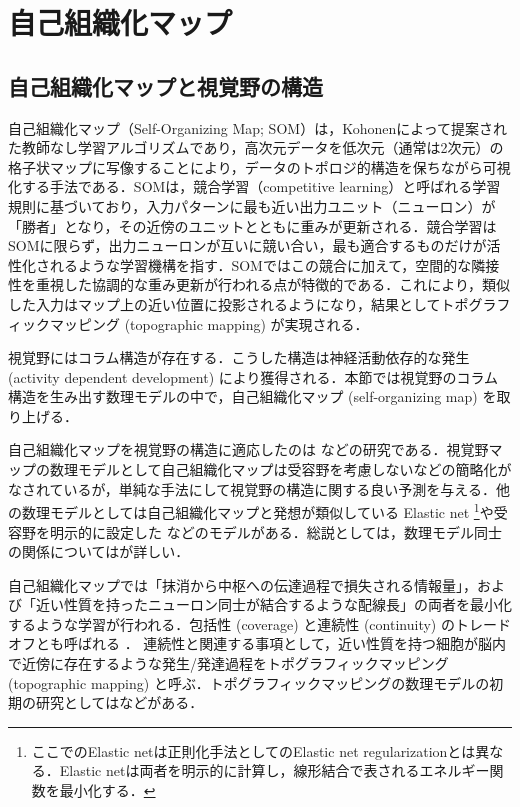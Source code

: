 \documentclass[titlepage]{ltjsbook}
\begin{document}
\section{自己組織化マップ}
\subsection{自己組織化マップと視覚野の構造}
自己組織化マップ（Self-Organizing Map; SOM）は，Kohonenによって提案された教師なし学習アルゴリズムであり，高次元データを低次元（通常は2次元）の格子状マップに写像することにより，データのトポロジ的構造を保ちながら可視化する手法である．SOMは，競合学習（competitive learning）と呼ばれる学習規則に基づいており，入力パターンに最も近い出力ユニット（ニューロン）が「勝者」となり，その近傍のユニットとともに重みが更新される．競合学習はSOMに限らず，出力ニューロンが互いに競い合い，最も適合するものだけが活性化されるような学習機構を指す．SOMではこの競合に加えて，空間的な隣接性を重視した協調的な重み更新が行われる点が特徴的である．これにより，類似した入力はマップ上の近い位置に投影されるようになり，結果としてトポグラフィックマッピング (topographic mapping) が実現される．

視覚野にはコラム構造が存在する．こうした構造は神経活動依存的な発生  (activity dependent development) により獲得される．本節では視覚野のコラム構造を生み出す数理モデルの中で，自己組織化マップ (self-organizing map) \citep{Kohonen1982-mn, Kohonen2013-yt}を取り上げる．

自己組織化マップを視覚野の構造に適応したのは\citep{Obermayer1990-gq, N_V_Swindale1998-ri} などの研究である．視覚野マップの数理モデルとして自己組織化マップは受容野を考慮しないなどの簡略化がなされているが，単純な手法にして視覚野の構造に関する良い予測を与える．他の数理モデルとしては自己組織化マップと発想が類似している Elastic net  \citep{Durbin1987-bp, Durbin1990-xx, Carreira-Perpinan2005-gy} \footnote{ここでのElastic netは正則化手法としてのElastic net regularizationとは異なる．Elastic netは両者を明示的に計算し，線形結合で表されるエネルギー関数を最小化する．}や受容野を明示的に設定した \citep{Tanaka2004-vz, Ringach2007-oe}などのモデルがある．総説としては\citep{Das2005-mq, Goodhill2007-va}，数理モデル同士の関係については\citep{2002-nm}が詳しい．

自己組織化マップでは「抹消から中枢への伝達過程で損失される情報量」，および「近い性質を持ったニューロン同士が結合するような配線長」の両者を最小化するような学習が行われる．包括性 (coverage) と連続性 (continuity) のトレードオフとも呼ばれる \citep{Carreira-Perpinan2005-gy}． 連続性と関連する事項として，近い性質を持つ細胞が脳内で近傍に存在するような発生/発達過程をトポグラフィックマッピング (topographic mapping) と呼ぶ．トポグラフィックマッピングの数理モデルの初期の研究としては\citep{Von_der_Malsburg1973-bz,Willshaw1976-zo, Takeuchi1979-mi}などがある．
\end{document}

